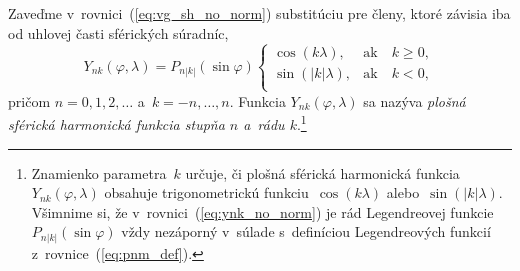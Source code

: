 \documentclass[a4paper, 12pt]{book}
\begin{document}
Zaveďme v~rovnici~(\ref{eq:vg_sh_no_norm}) substitúciu pre členy, ktoré závisia
iba od uhlovej časti sférických súradníc,
%
\begin{equation}
\label{eq:ynk_no_norm}
Y_{nk}(\varphi, \lambda) = P_{n|k|}(\sin\varphi)
%
\begin{cases}
\cos(k\lambda){,}    &\text{ak} \quad k \geq 0{,}\\
\sin(|k|\lambda){,}  &\text{ak} \quad k < 0{,}\\
\end{cases}
\end{equation}
%
pričom $n = 0, 1, 2, \dots$ a~$k = -n, \dots, n$.  Funkcia $Y_{nk}(\varphi,
\lambda)$ sa nazýva \emph{plošná sférická harmonická funkcia stupňa $n$ a~rádu
$k$}.\footnote{Znamienko parametra~$k$ určuje, či plošná sférická harmonická 
funkcia~$Y_{nk}(\varphi, \lambda)$ obsahuje trigonometrickú 
funkciu~$\cos(k\lambda)$ alebo~$\sin(|k|\lambda)$.  Všimnime si, že 
v~rovnici~(\ref{eq:ynk_no_norm}) je rád Legendreovej 
funkcie~$P_{n|k|}(\sin\varphi)$ vždy nezáporný v~súlade s~definíciou 
Legendreových funkcií z~rovnice~(\ref{eq:pnm_def}).}
\end{document}
